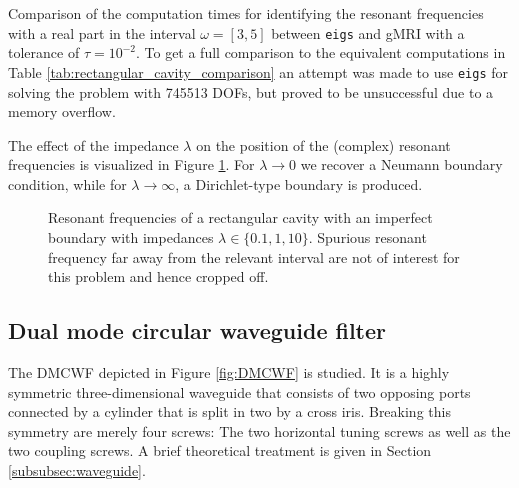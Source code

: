 \documentclass[11pt, a4paper]{article}
\begin{document}
\begin{table}[ht]
    \caption{Comparison of the computation times for identifying the resonant
    frequencies with a real part in the interval $\omega=[3, 5]$ between \texttt{eigs} and
    \acrshort{gMRI} with a tolerance of $\tau = 10^{-2}$. To get a full
    comparison to the equivalent computations in Table \ref{tab:rectangular_cavity_comparison}
    an attempt was made to use \texttt{eigs} for solving the problem with 
    745513 \acrshort{DOF}s, but proved to be unsuccessful due to a memory overflow.}
    \label{tab:imperfect-conductor-comparison}
    
\end{table}

The effect of the impedance $\lambda$ on the position of the (complex) resonant
frequencies is visualized in Figure \ref{fig:imperfect-conductor-eigfreqs}.
For $\lambda \to 0$ we recover a Neumann boundary condition, while for 
$\lambda \to \infty$, a Dirichlet-type boundary is produced.
\begin{figure}[ht]
    \centering
    
    \caption{Resonant frequencies of a rectangular cavity with an imperfect boundary
    with impedances $\lambda \in \{0.1, 1, 10\}$. Spurious resonant frequency far
    away from the relevant interval are not of interest for this problem and hence
    cropped off.}
    \label{fig:imperfect-conductor-eigfreqs}
\end{figure}

\clearpage
\subsection{Dual mode circular waveguide filter}
\label{subsec:examples-dmcwf}

The \acrfull{DMCWF} depicted in Figure \ref{fig:DMCWF} is studied. It is a
highly symmetric three-dimensional waveguide that consists of two opposing
ports connected by a cylinder that is split in two by a cross iris. 
Breaking this symmetry are merely four screws: The two horizontal tuning
screws as well as the two coupling screws. A brief theoretical treatment is given
in Section \ref{subsubsec:waveguide}.
\end{document}
